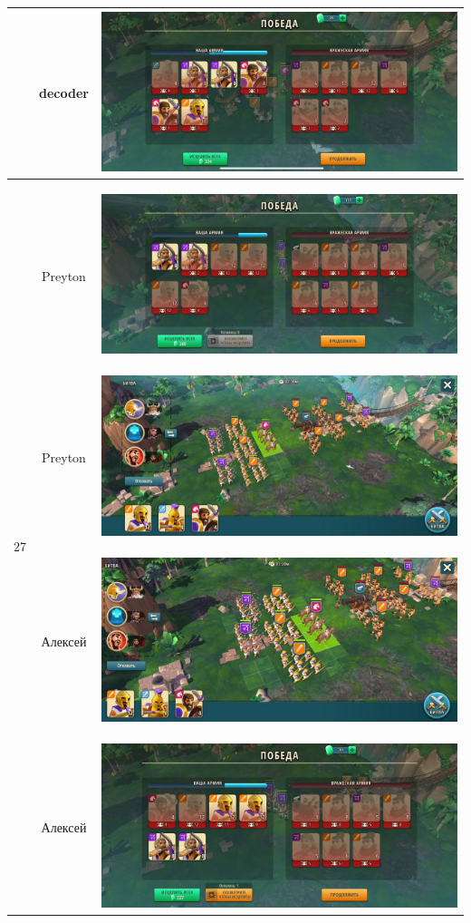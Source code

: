 \begin{longtable}{|c|c|c|}
	& decoder &
	\includegraphics[width=0.75\linewidth]{./parts/media/TreasureHunt/26/decoder/photo_2022-04-06_18-11-23.jpg} \\
	\hline
	\multirow{6}{*}{27} & Preyton &
	\hypertarget{fight27}{\includegraphics[width=0.75\linewidth]{./parts/media/TreasureHunt/27/Preyton/27..jpg}} \\
	& Preyton &
	\includegraphics[width=0.75\linewidth]{./parts/media/TreasureHunt/27/Preyton/27.jpg} \\
	\hline
	\multirow{6}{*}{27} & Алексей &
	\hypertarget{fight27}{\includegraphics[width=0.75\linewidth]{./parts/media/TreasureHunt/27/alexey/photo_2022-04-14_12-34-58.jpg}} \\
	& Алексей &
	\includegraphics[width=0.75\linewidth]{./parts/media/TreasureHunt/27/alexey/photo_2022-04-14_12-34-36.jpg} \\

\end{longtable}
